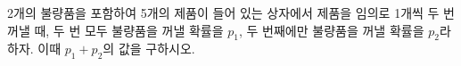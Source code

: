 2개의 불량품을 포함하여 5개의 제품이 들어 있는 상자에서 제품을 임의로 1개씩 두 번 꺼낼 때, 두 번 모두 불량품을 꺼낼 확률을 $p_1$, 두 번째에만 불량품을 꺼낼 확률을 $p_2$라 하자. 이때 $p_1+p_2$의 값을 구하시오. 
